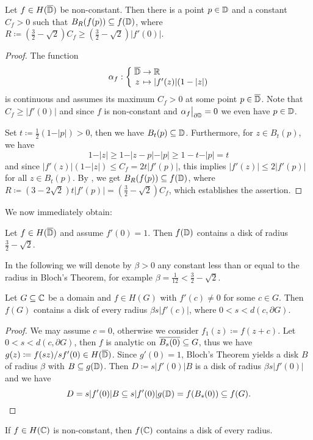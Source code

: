 \begin{theorem} \label{thm:bloch-stronger}
    Let $f \in H(\overline{\mathbb{D}})$ be non-constant. Then there is a point $p \in \mathbb{D}$ and a constant $C_f > 0$ such that $B_{R}(f(p)) \subseteq f(\mathbb{D})$, where $R \coloneqq (\frac{3}{2} - \sqrt{2}) C_f \geq (\frac{3}{2} - \sqrt{2}) \vert f'(0) \vert$.
\end{theorem}

\begin{proof}
    The function
    $$ \mapping{\alpha_f}{\cl{\D} & \to & \R}{z & \mapsto & \vert f'(z) \vert (1 - \vert z \vert)} $$
    is continuous and assumes its maximum $C_f > 0$ at some point $p \in \overline{\mathbb{D}}$. Note that $C_f \geq \vert f'(0) \vert$ and since $f$ is non-constant and $\restr{\alpha_f}{\partial \D} = 0$ we even have $p \in \mathbb{D}$.

    Set $t \coloneqq \frac{1}{2}(1 - \vert p \vert) > 0$, then we have $B_{t}(p) \subseteq \mathbb{D}$. Furthermore, for $z \in B_t(p)$, we have
    $$ 1 - \vert z \vert \geq 1 - \vert z - p \vert - \vert p \vert \geq 1 - t - \vert p \vert = t $$
    and since $\vert f'(z) \vert (1 - \vert z \vert) \leq C_f = 2 t \vert f'(p) \vert$, this implies $\vert f'(z) \vert \leq 2 \vert f'(p) \vert$ for all $z \in B_t(p)$. By , we get $ B_{R}(f(p)) \subseteq f(\mathbb{D}) $, where $R \coloneqq (3 - 2 \sqrt{2}) t \vert f'(p) \vert = ({\textstyle \frac{3}{2}} - \sqrt{2}) C_f$,
    which establishes the assertion.
\end{proof}

We now immediately obtain:    

\begin{theorem}[Bloch] \label{thm:bloch}
    Let $f \in H(\overline{\mathbb{D}})$ and assume $f'(0) = 1$. Then $f(\mathbb{D})$ contains a disk of radius $\frac{3}{2} - \sqrt{2}$.
\end{theorem}

In the following we will denote by $\beta > 0$ any constant less than or equal to the radius in Bloch's Theorem, for example $\beta = \frac{1}{12} < \frac{3}{2} - \sqrt{2}$.

\begin{corollary} \label{cor:bloch-domain}
    Let $G \subseteq \mathbb{C}$ be a domain and $f \in H(G)$ with $f'(c) \neq 0$ for some $c \in G$. Then $f(G)$ contains a disk of every radius $\beta s \vert f'(c) \vert$, where $0 < s < d(c, \partial G)$.
\end{corollary}

\begin{proof}
    We may assume $c = 0$, otherwise we consider $f_1(z) \coloneqq f(z+c)$. Let $0 < s < d(c, \partial G)$, then $f$ is analytic on $\overline{B_s(0)} \subseteq G$, thus we have $g(z) \coloneqq f(sz) / sf'(0) \in H(\overline{\mathbb{D}})$. Since $g'(0) = 1$, Bloch's Theorem yields a disk $B$ of radius $\beta$ with $B \subseteq g(\mathbb{D})$. Then $D \coloneqq s \vert f'(0) \vert B$ is a disk of radius $\beta s \vert f'(0) \vert$ and we have
    \begin{equation*}
        D = s \vert f'(0) \vert B \subseteq s \vert f'(0) \vert g(\mathbb{D}) = f(B_s(0)) \subseteq f(G).
    \end{equation*}
\end{proof}

\begin{corollary} \label{cor:bloch-entire}
    If $f \in H(\mathbb{C})$ is non-constant, then $f(\mathbb{C})$ contains a disk of every radius.
\end{corollary}